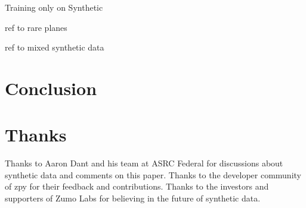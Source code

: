 \documentclass{article}
\begin{document}
Training only on Synthetic

ref to rare planes

ref to mixed synthetic data

\section{Conclusion}
\label{sec:conclusion}



\section{Thanks}
\label{sec:thanks}

Thanks to Aaron Dant and his team at ASRC Federal for discussions about synthetic data and comments on this paper. Thanks to the developer community of zpy for their feedback and contributions. Thanks to the investors and supporters of Zumo Labs for believing in the future of synthetic data.



\end{document}
